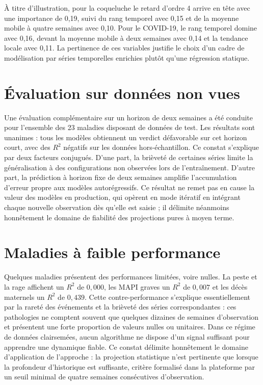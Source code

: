 À titre d'illustration, pour la coqueluche le retard d'ordre 4 arrive en tête avec
une importance de 0,19, suivi du rang temporel avec 0,15 et de la moyenne mobile à
quatre semaines avec 0,10. Pour le COVID-19, le rang temporel domine avec 0,16,
devant la moyenne mobile à deux semaines avec 0,14 et la tendance locale avec 0,11.
La pertinence de ces variables justifie le choix d'un cadre de modélisation par
séries temporelles enrichies plutôt qu'une régression statique.

\section{Évaluation sur données non vues}

Une évaluation complémentaire sur un horizon de deux semaines a été conduite pour
l'ensemble des 23 maladies disposant de données de test. Les résultats sont
unanimes : tous les modèles obtiennent un verdict défavorable sur cet horizon court,
avec des $R^2$ négatifs sur les données hors-échantillon. Ce constat s'explique par
deux facteurs conjugués. D'une part, la brièveté de certaines séries limite la
généralisation à des configurations non observées lors de l'entraînement. D'autre
part, la prédiction à horizon fixe de deux semaines amplifie l'accumulation d'erreur
propre aux modèles autorégressifs. Ce résultat ne remet pas en cause la valeur des
modèles en production, qui opèrent en mode itératif en intégrant chaque nouvelle
observation dès qu'elle est saisie ; il délimite néanmoins honnêtement le domaine
de fiabilité des projections pures à moyen terme.

\section{Maladies à faible performance}

Quelques maladies présentent des performances limitées, voire nulles. La peste et la
rage affichent un $R^2$ de $0{,}000$, les MAPI graves un $R^2$ de $0{,}007$ et les
décès maternels un $R^2$ de $0{,}439$. Cette contre-performance s'explique
essentiellement par la rareté des événements et la brièveté des séries
correspondantes : ces pathologies ne comptent souvent que quelques dizaines de
semaines d'observation et présentent une forte proportion de valeurs nulles ou
unitaires. Dans ce régime de données clairsemées, aucun algorithme ne dispose d'un
signal suffisant pour apprendre une dynamique fiable. Ce constat délimite
honnêtement le domaine d'application de l'approche : la projection statistique n'est
pertinente que lorsque la profondeur d'historique est suffisante, critère formalisé
dans la plateforme par un seuil minimal de quatre semaines consécutives
d'observation.


